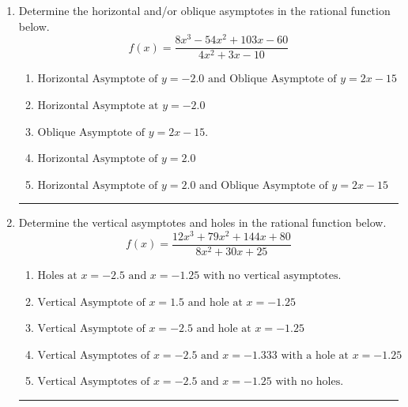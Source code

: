 \documentclass[14pt]{extbook}
\newcommand{\litem}[1]{\item#1\hspace*{-1cm}\rule{\textwidth}{0.4pt}}
\begin{document}
\begin{enumerate}
{\begin{enumerate}[label=\Alph*.]
\end{enumerate} }
\litem{
Determine the horizontal and/or oblique asymptotes in the rational function below.\[ f(x) = \frac{8x^{3} -54 x^{2} +103 x -60}{4x^{2} +3 x -10} \]\begin{enumerate}[label=\Alph*.]
\item \( \text{Horizontal Asymptote of } y = -2.0 \text{ and Oblique Asymptote of } y = 2x -15 \)
\item \( \text{Horizontal Asymptote at } y = -2.0 \)
\item \( \text{Oblique Asymptote of } y = 2x -15. \)
\item \( \text{Horizontal Asymptote of } y = 2.0  \)
\item \( \text{Horizontal Asymptote of } y = 2.0 \text{ and Oblique Asymptote of } y = 2x -15 \)

\end{enumerate} }
\litem{
Determine the vertical asymptotes and holes in the rational function below.\[ f(x) = \frac{12x^{3} +79 x^{2} +144 x + 80}{8x^{2} +30 x + 25} \]\begin{enumerate}[label=\Alph*.]
\item \( \text{Holes at } x = -2.5 \text{ and } x = -1.25 \text{ with no vertical asymptotes.} \)
\item \( \text{Vertical Asymptote of } x = 1.5 \text{ and hole at } x = -1.25 \)
\item \( \text{Vertical Asymptote of } x = -2.5 \text{ and hole at } x = -1.25 \)
\item \( \text{Vertical Asymptotes of } x = -2.5 \text{ and } x = -1.333 \text{ with a hole at } x = -1.25 \)
\item \( \text{Vertical Asymptotes of } x = -2.5 \text{ and } x = -1.25 \text{ with no holes.} \)

\end{enumerate} }
\end{enumerate}
\end{document}
